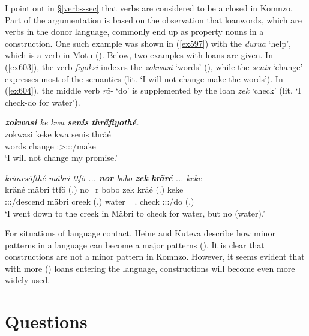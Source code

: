 I point out in {\S}\ref{verbs-sec} that verbs are considered to be a closed  in Komnzo. Part of the argumentation is based on the observation that loanwords, which are verbs in the donor language, commonly end up as property nouns in a  construction. One such example was shown in (\ref{ex597}) with the  \emph{durua} `help', which is a  verb in Motu (\citealt[61]{Turnerlister:1935motu}). Below, two examples with  loans are given. In (\ref{ex603}), the verb \emph{fiyoksi} indexes the  \emph{zokwasi} `words' (\Stpl), while the  \emph{senis} `change' expresses most of the semantics (lit. `I will not change-make the words'). In (\ref{ex604}), the middle verb \emph{rä-} `do' is supplemented by the  loan \emph{zek} `check' (lit. `I check-do for water').

\begin{exe}
	\ex \emph{\textbf{zokwasi} ke kwa \textbf{senis} \textbf{thräfiyothé}.}\\
	\gll zokwasi keke kwa senis thräé\\
	words {\Neg} {\Fut} change \Fsg:\Sbj>\Stpl:\Obj:\Irr:\Pfv/make\\
	\trans `I will not change my promise.'
	\label{ex603}
\end{exe}
\begin{exe}
	\ex \emph{kränrsöfthé mäbri ttfö ... \textbf{nor} bobo \textbf{zek} \textbf{kräré} ... keke}\\
	\gll kräné mäbri ttfö (.) no=r bobo zek kräé (.) keke\\
	\Fsg:\Sbj:\Irr:\Pfv/descend mäbri creek (.) water={\Purp} \Med.{\All} check \Fsg:\Sbj:\Irr:\Pfv/do (.) \Neg\\
	\trans `I went down to the creek in Mäbri to check for water, but no (water).'\\
	\label{ex604}
\end{exe}

For situations of language contact, Heine and Kuteva describe how minor patterns in a language can become a major patterns (\citeyear[44]{Heine:2005wp}). It is clear that  constructions are not a minor pattern in Komnzo. However, it seems evident that with more () loans entering the language,  constructions will become even more widely used.

\section{Questions}\label{questions}

